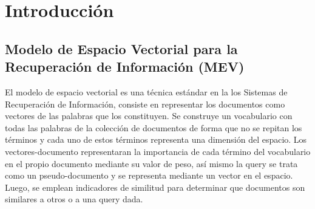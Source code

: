 \documentclass[a4paper,12pt]{article}
\begin{document}
\section{Introducción}\label{sec:intro}

\subsection{Modelo de Espacio Vectorial para la Recuperación de Información (MEV)}
El modelo de espacio vectorial es una técnica estándar en la los Sistemas de Recuperación de
Información, consiste en representar los documentos como vectores de las palabras que los
constituyen. Se construye un vocabulario con todas las palabras de la colección de documentos
de forma que no se repitan los términos y cada uno de estos términos representa una dimensión
del espacio. Los vectores-documento representaran la importancia de cada término del
vocabulario en el propio documento mediante su valor de peso, así mismo la query se trata
como un pseudo-documento y se representa mediante un vector en el espacio. Luego, se
emplean indicadores de similitud para determinar que documentos son similares a otros o a una
query dada.
\end{document}
